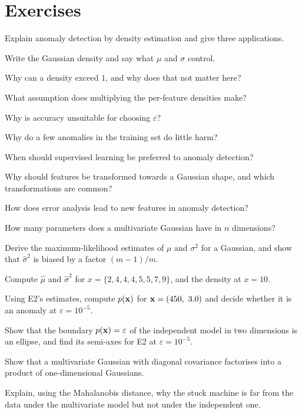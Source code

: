 \section*{Exercises}


\sq Explain anomaly detection by density estimation and give three applications.

\sq Write the Gaussian density and say what $\mu$ and $\sigma$ control.

\sq Why can a density exceed $1$, and why does that not matter here?

\sq What assumption does multiplying the per-feature densities make?

\sq Why is accuracy unsuitable for choosing $\varepsilon$?

\sq Why do a few anomalies in the training set do little harm?

\sq When should supervised learning be preferred to anomaly detection?

\sq Why should features be transformed towards a Gaussian shape, and which
transformations are common?

\sq How does error analysis lead to new features in anomaly detection?

\sq How many parameters does a multivariate Gaussian have in $n$ dimensions?


\ap Derive the maximum-likelihood estimates of $\mu$ and $\sigma^2$ for a
Gaussian, and show that $\hat\sigma^2$ is biased by a factor $(m-1)/m$.

\ap Compute $\hat\mu$ and $\hat\sigma^2$ for $x = \{2, 4, 4, 4, 5, 5, 7, 9\}$, and
the density at $x = 10$.

\ap Using E2's estimates, compute $p(\mathbf{x})$ for $\mathbf{x} = (450,\ 3.0)$ and decide
whether it is an anomaly at $\varepsilon = 10^{-5}$.

\ap Show that the boundary $p(\mathbf{x}) = \varepsilon$ of the independent model in two
dimensions is an ellipse, and find its semi-axes for E2 at $\varepsilon =
10^{-5}$.

\ap Show that a multivariate Gaussian with diagonal covariance factorises into a
product of one-dimensional Gaussians.

\ap Explain, using the Mahalanobis distance, why the stuck machine is far from
the data under the multivariate model but not under the independent one.


